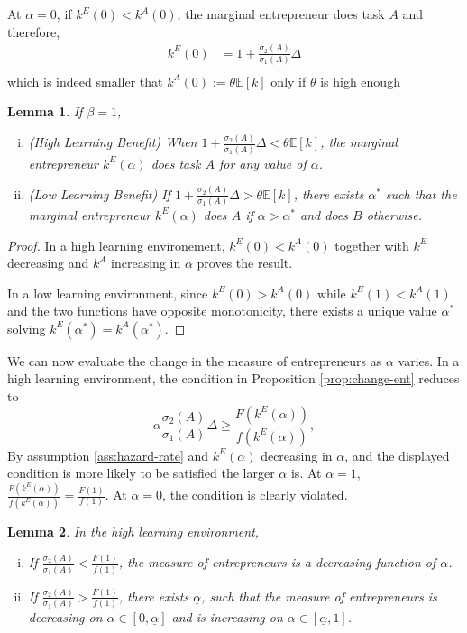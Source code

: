\documentclass[12pt]{article}
\newtheorem{lemma}{Lemma}
\newcommand{\E}[1]{\mathbb E[#1]}
\begin{document}
At $\alpha=0$, if $k^E(0)<k^A(0)$, the marginal entrepreneur does task $A$ and therefore,
\begin{align*}
    k^E(0)&=1+\frac{\sigma_2(A)}{\sigma_1(A)}\Delta\\ 
\end{align*}
which is indeed smaller that $k^A(0):=\theta \E k$ only if $\theta$ is high enough
%
\begin{lemma}
    If $\beta=1$, 
    \begin{enumerate}[(i)]
        \item (High Learning Benefit) When $1+\frac{\sigma_2(A)}{\sigma_1(A)}\Delta<\theta \E k$, the marginal entrepreneur $k^E(\alpha)$ does task $A$ for any value of $\alpha$.
        \item (Low Learning Benefit) If $1+\frac{\sigma_2(A)}{\sigma_1(A)}\Delta>\theta \E k$, there exists $\alpha^*$ such that the marginal entrepreneur $k^E(\alpha)$ does $A$ if $\alpha>\alpha^*$ and does $B$ otherwise.
    \end{enumerate}
\end{lemma}
%
\begin{proof}
    In a high learning environement, $k^E(0)<k^A(0)$ together with $k^E$ decreasing and $k^A$ increasing in $\alpha$ proves the result.

    In a low learning environment, since $k^E(0)>k^A(0)$ while $k^E(1)<k^A(1)$ and the two functions have opposite monotonicity, there exists a unique value $\alpha^*$ solving $k^E(\alpha^*)= k^A(\alpha^*)$. 
\end{proof}
We can now evaluate the change in the measure of entrepreneurs as $\alpha$ varies. In a high learning environment, the condition in Proposition \ref{prop:change-ent} reduces to
%
\[
\alpha \frac{\sigma_2(A)}{\sigma_1(A)}\Delta \geq \frac{F(k^E(\alpha))}{f(k^E(\alpha))}, 
\]
%
By assumption \ref{ass:hazard-rate} and $k^E(\alpha)$ decreasing in $\alpha$, and the displayed condition is more likely to be satisfied the larger $\alpha$ is. At $\alpha=1$, $\frac{F(k^E(\alpha))}{f(k^E(\alpha))}=\frac{F(1)}{f(1)}$. At $\alpha=0$, the condition is clearly violated.
\begin{lemma}
    In the high learning environment,
    \begin{enumerate}[(i)]
        \item If $\frac{\sigma_2(A)}{\sigma_1(A)}<\frac{F(1)}{f(1)}$, the measure of entrepreneurs is a decreasing function of $\alpha$.
        \item If $\frac{\sigma_2(A)}{\sigma_1(A)}>\frac{F(1)}{f(1)}$, there exists $\underline \alpha$, such that the measure of entrepreneurs is decreasing on $\alpha\in[0,\underline \alpha]$ and is increasing on $\alpha\in [\underline \alpha,1]$. 
    \end{enumerate}
\end{lemma}
\end{document}
